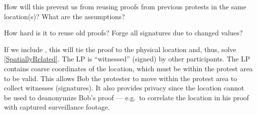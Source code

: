 \begin{frame}

  \pause

  \begin{question}
    How will this prevent us from reusing proofs from previous protests in 
    the same location(s)?
    What are the assumptions?
  \end{question}
  \begin{question}
    How hard is it to reuse old proofs?
    Forge all signatures due to changed values?
  \end{question}
\end{frame}

If we include , this will tie the proof to the physical location and, 
thus, solve \cref{SpatiallyRelated}.
The \ac{LP} is \enquote{witnessed} (signed) by other participants.
The \ac{LP} contains coarse coordinates of the location, which must be within 
the protest area to be valid.
This allows Bob the protester to move within the protest area to collect 
witnesses (signatures).
It also provides privacy since the location cannot be used to deanonymize Bob's 
proof --- e.g.\ to correlate the location in his proof with captured 
surveillance footage.

